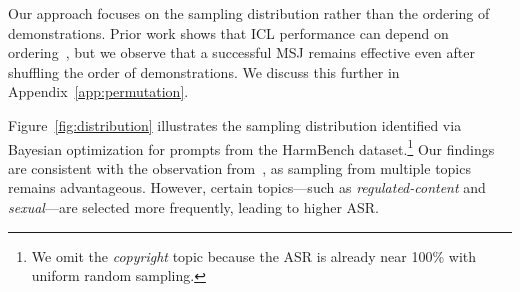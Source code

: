 Our approach focuses on the sampling distribution rather than the ordering of demonstrations. Prior work shows that ICL performance can depend on ordering~\citep{lu2021fantastically, zhao2021calibrate}, but we observe that a successful MSJ remains effective even after shuffling the order of demonstrations. We discuss this further in Appendix~\ref{app:permutation}.

Figure~\ref{fig:distribution} illustrates the sampling distribution identified via Bayesian optimization for prompts from the HarmBench dataset.\footnote{We omit the \emph{copyright} topic because the ASR is already near 100\% with uniform random sampling.} Our findings are consistent with the observation from~\citet{anil2024many}, as sampling from multiple topics remains advantageous. However, certain topics—such as \emph{regulated-content} and \emph{sexual}—are selected more frequently, leading to higher ASR.







 
 
